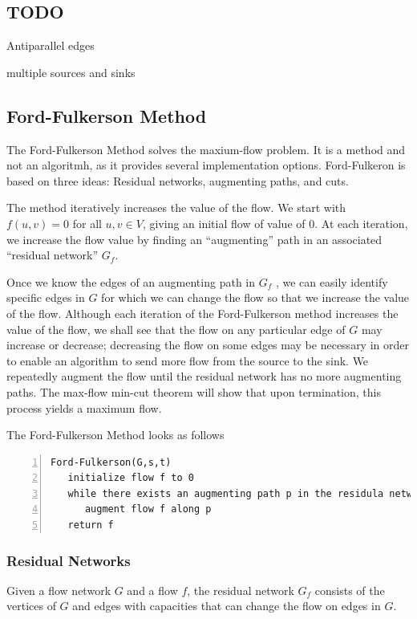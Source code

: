 \subsection{TODO}

Antiparallel edges

multiple sources and sinks

\subsection{Ford-Fulkerson Method}

The Ford-Fulkerson Method solves the maxium-flow problem. It is a method and not an algoritmh, as it provides several implementation options. Ford-Fulkeron is based on three ideas: Residual networks, augmenting paths, and cuts.

The method iteratively increases the value of the flow. We start with $f(u,v)=0$ for all $u,v \in V$, giving an initial flow of value of $0$. At each iteration, we increase the flow value by finding an ``augmenting'' path in an associated ``residual network'' $G_f$.

Once we know the edges of an augmenting path in $G_f$ , we can easily identify speciﬁc edges in $G$ for which we can change the ﬂow so that we increase the value of the ﬂow. Although each iteration of the Ford-Fulkerson method increases the value of the ﬂow, we shall see that the ﬂow on any particular edge of $G$ may increase or decrease; decreasing the ﬂow on some edges may be necessary in order to enable an algorithm to send more ﬂow from the source to the sink. We repeatedly augment the ﬂow until the residual network has no more augmenting paths. The max-ﬂow min-cut theorem will show that upon termination, this process yields a maximum ﬂow.

The Ford-Fulkerson Method looks as follows

\begin{Verbatim}[numbers=left, xleftmargin=5mm]
Ford-Fulkerson(G,s,t)
   initialize flow f to 0
   while there exists an augmenting path p in the residula network G_f
      augment flow f along p
   return f
\end{Verbatim}


\subsubsection{Residual Networks}

Given a flow network $G$ and a flow $f$, the residual network $G_f$ consists of the vertices of $G$ and edges with capacities that can change the flow on edges in $G$.

